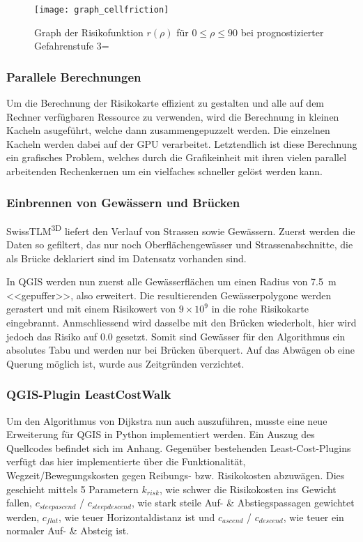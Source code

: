 \begin{multicols}{2}
\begin{figure}[H]
  \centering
  \texttt{[image: graph\_cellfriction]}
  \caption{Graph der Risikofunktion $r(\rho)$ für $0 \leq \rho \leq 90$ bei prognostizierter Gefahrenstufe 3=}\label{fig:graph}
\end{figure}

\subsubsection{Parallele Berechnungen}

Um die Berechnung der Risikokarte effizient zu gestalten und alle auf dem Rechner verfügbaren Ressource zu verwenden, wird die Berechnung in kleinen Kacheln asugeführt, welche dann zusammengepuzzelt werden. Die einzelnen Kacheln werden dabei auf der GPU verarbeitet. Letztendlich ist diese Berechnung ein grafisches Problem, welches durch die Grafikeinheit mit ihren vielen parallel arbeitenden Rechenkernen um ein vielfaches schneller gelöst werden kann.

\subsubsection{Einbrennen von Gewässern und Brücken}

SwissTLM\textsuperscript{3D} liefert den Verlauf von Strassen sowie Gewässern. Zuerst werden die Daten so gefiltert, das nur noch Oberflächengewässer und Strassenabschnitte, die als Brücke deklariert sind im Datensatz vorhanden sind.

In QGIS werden nun zuerst alle Gewässerflächen um einen Radius von \qty{7.5}{m} <<gepuffer>>, also erweitert. Die resultierenden Gewässerpolygone werden gerastert und mit einem Risikowert von $9 \times 10^{9}$ in die rohe Risikokarte eingebrannt. Anmschliessend wird dasselbe mit den Brücken wiederholt, hier wird jedoch das Risiko auf $0.0$ gesetzt. Somit sind Gewässer für den Algorithmus ein absolutes Tabu und werden nur bei Brücken überquert. Auf das Abwägen ob eine Querung möglich ist, wurde aus Zeitgründen verzichtet.

\subsubsection{QGIS-Plugin LeastCostWalk}

Um den Algorithmus von Dijkstra nun auch auszuführen, musste eine neue Erweiterung für QGIS in Python implementiert werden. Ein Auszug des Quellcodes befindet sich im Anhang. Gegenüber bestehenden Least-Cost-Plugins verfügt das hier implementierte über die Funktionalität, Wegzeit/Bewegungskosten gegen Reibungs- bzw. Risikokosten abzuwägen. Dies geschieht mittels 5 Parametern $k_{risk}$, wie schwer die Risikokosten ins Gewicht fallen, $c_{steepascend}$ / $c_{steepdescend}$, wie stark steile Auf- \& Abstiegspassagen gewichtet werden, $c_{flat}$, wie teuer Horizontaldistanz ist und $c_{ascend}$ / $c_{descend}$, wie teuer ein normaler Auf- \& Absteig ist.


\end{multicols}
